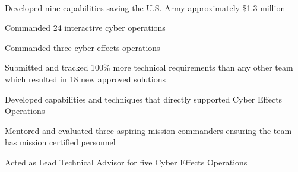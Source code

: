 \documentclass[]{resume}
\begin{document}
\begin{minipage}[t]{0.69\textwidth}
 \\
\begin{tightemize}
\item Developed nine capabilities saving the U.S. Army approximately \$1.3 million
\item Commanded 24 interactive cyber operations
\item Commanded three cyber effects operations
\item Submitted and tracked 100\% more technical requirements than any other team which resulted in 18 new approved solutions
\item Developed capabilities and techniques that directly supported Cyber Effects Operations
\item Mentored and evaluated three aspiring mission commanders ensuring the team has mission certified personnel
\item Acted as Lead Technical Advisor for five Cyber Effects Operations
\end{tightemize}

\sectionsep



\end{minipage}
\end{document}
